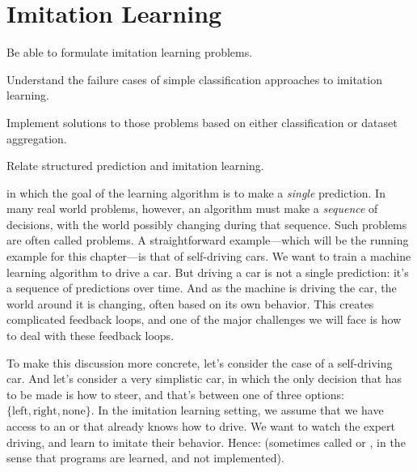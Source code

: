\chapter{Imitation Learning} \label{sec:imit}


\begin{learningobjectives}
\item Be able to formulate imitation learning problems.
\item Understand the failure cases of simple classification approaches to imitation learning.
\item Implement solutions to those problems based on either classification or dataset aggregation.
\item Relate structured prediction and imitation learning.
\end{learningobjectives}

\dependencies{}

 in which the goal of the learning algorithm is to make a \emph{single} prediction.
In many real world problems, however, an algorithm must make a \emph{sequence} of decisions, with the world possibly changing during that sequence.
Such problems are often called  problems.
A straightforward example---which will be the running example for this chapter---is that of self-driving cars.
We want to train a machine learning algorithm to drive a car.
But driving a car is not a single prediction: it's a sequence of predictions over time.
And as the machine is driving the car, the world around it is changing, often based on its own behavior.
This creates complicated feedback loops, and one of the major challenges we will face is how to deal with these feedback loops.

To make this discussion more concrete, let's consider the case of a self-driving car.
And let's consider a very simplistic car, in which the only decision that has to be made is how to steer, and that's between one of three options: $\{ \text{left}, \text{right}, \text{none} \}$.
In the imitation learning setting, we assume that we have access to an  or  that already knows how to drive.
We want to watch the expert driving, and learn to imitate their behavior.
Hence:  (sometimes called  or , in the sense that programs are learned, and not implemented).

